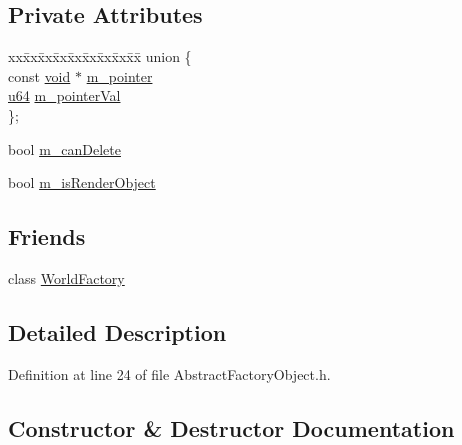 \subsection*{Private Attributes}
\begin{DoxyCompactItemize}
\item 
\begin{tabbing}
xx\=xx\=xx\=xx\=xx\=xx\=xx\=xx\=xx\=\kill
union \{\\
\>const \mbox{\hyperlink{_thread_8h_af1e856da2e658414cb2456cb6f7ebc66}{void}} $\ast$ \mbox{\hyperlink{classnjli_1_1_abstract_factory_object_a8eea2673c37f55c871de8a808a1a0b94}{m\_pointer}}\\
\>\mbox{\hyperlink{_util_8h_ad758b7a5c3f18ed79d2fcd23d9f16357}{u64}} \mbox{\hyperlink{classnjli_1_1_abstract_factory_object_af1a3dd67b0ce2fc70cff9ca111263829}{m\_pointerVal}}\\
\}; \\

\end{tabbing}\item 
bool \mbox{\hyperlink{classnjli_1_1_abstract_factory_object_a4977cfd3030c6610ea54ec279b253f45}{m\+\_\+can\+Delete}}
\item 
bool \mbox{\hyperlink{classnjli_1_1_abstract_factory_object_a7b32ea157388606e926495880208db97}{m\+\_\+is\+Render\+Object}}
\end{DoxyCompactItemize}
\subsection*{Friends}
\begin{DoxyCompactItemize}
\item 
class \mbox{\hyperlink{classnjli_1_1_abstract_factory_object_acb96ebb09abe8f2a37a915a842babfac}{World\+Factory}}
\end{DoxyCompactItemize}


\subsection{Detailed Description}


Definition at line 24 of file Abstract\+Factory\+Object.\+h.



\subsection{Constructor \& Destructor Documentation}
\mbox{\label{classnjli_1_1_abstract_factory_object_ad8a2eaf0b14375ad9739a8968429739e}} 
